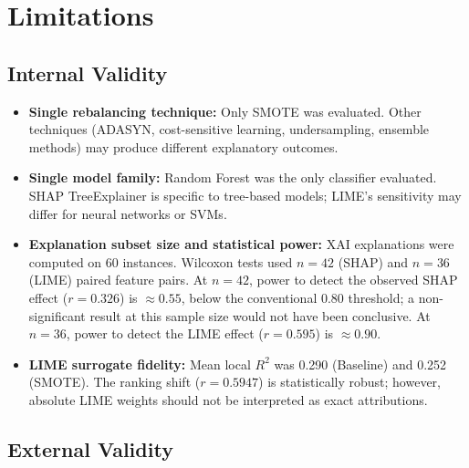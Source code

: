 \documentclass[conference,a4paper]{IEEEtran}
\newcommand{\SMOTE}{SMOTE\xspace}
\newcommand{\XAI}{XAI\xspace}
\begin{document}
\section{Limitations}
\label{sec:limitations}

\subsection{Internal Validity}

\begin{itemize}
  \item \textbf{Single rebalancing technique:} Only \SMOTE was evaluated. Other
        techniques (ADASYN, cost-sensitive learning, undersampling, ensemble
        methods) may produce different explanatory outcomes.
  \item \textbf{Single model family:} Random Forest was the only classifier
        evaluated. SHAP TreeExplainer is specific to tree-based models; LIME's
        sensitivity may differ for neural networks or SVMs.
  \item \textbf{Explanation subset size and statistical power:} \XAI explanations
        were computed on 60 instances. Wilcoxon tests used $n=42$ (SHAP) and
        $n=36$ (LIME) paired feature pairs. At $n=42$, power to detect the
        observed SHAP effect ($r=0.326$) is $\approx 0.55$, below the conventional
        0.80 threshold; a non-significant result at this sample size would not
        have been conclusive. At $n=36$, power to detect the LIME effect
        ($r=0.595$) is $\approx 0.90$.
  \item \textbf{LIME surrogate fidelity:} Mean local $R^2$ was 0.290 (Baseline)
        and 0.252 (SMOTE). The ranking shift ($r=0.5947$) is statistically
        robust; however, absolute LIME weights should not be interpreted as exact
        attributions.
\end{itemize}

\subsection{External Validity}
\end{document}
